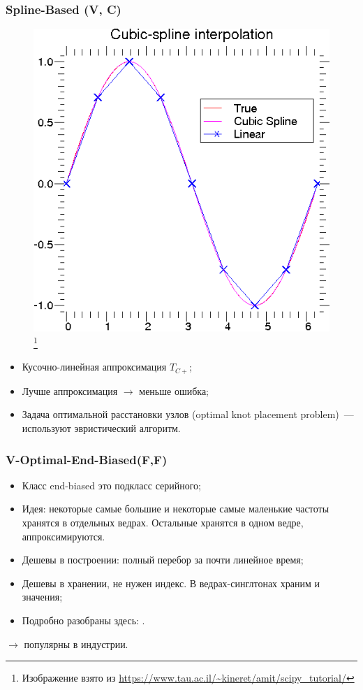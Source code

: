 \documentclass{beamer}
\begin{document}
\begin{frame}
\frametitle{Spline-Based (V, C)}

\begin{figure}[htb]
\includegraphics[width=\textwidth,height=0.39\textheight,keepaspectratio]{spline.png} 
\footnote{\tiny{Изображение взято из \url{https://www.tau.ac.il/~kineret/amit/scipy_tutorial/}}}
\end{figure}

\begin{itemize}
  \setlength\itemsep{1em}
  \item Кусочно-линейная \alert{аппроксимация} $T_{C+}$;
  \item Лучше \alert{аппроксимация} $\rightarrow$ меньше ошибка;
  \item Задача оптимальной расстановки узлов (optimal knot placement problem)~--- используют эвристический алгоритм.
\end{itemize}

\end{frame}

\begin{frame}
\frametitle{V-Optimal-End-Biased(F,F)}

\begin{itemize}
  \setlength\itemsep{1em}
  \item Класс end-biased это подкласс серийного;
  \item Идея: некоторые самые большие и некоторые самые маленькие частоты хранятся в отдельных ведрах. Остальные хранятся в одном ведре, аппроксимируются.
  \item Дешевы в построении: полный перебор за почти линейное время;
  \item Дешевы в хранении, не нужен индекс. В ведрах-синглтонах храним и значения;
  \item Подробно разобраны здесь: \cite{Ioannidis19952}.
  \end{itemize}
$\longrightarrow$ популярны в индустрии.
\end{frame}
\end{document}
